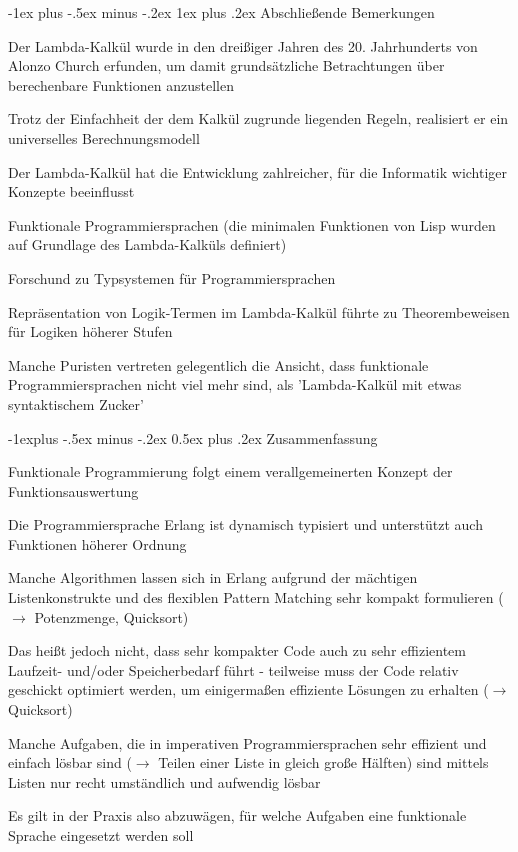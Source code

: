 \documentclass[10pt]{article}
\makeatletter
\renewcommand{\subsection}{\@startsection{subsection}{2}{0mm}%
                                {-1explus -.5ex minus -.2ex}%
                                {0.5ex plus .2ex}%
                                {\normalfont\normalsize\bfseries}}
\renewcommand{\subsubsection}{\@startsection{subsubsection}{3}{0mm}%
                                {-1ex plus -.5ex minus -.2ex}%
                                {1ex plus .2ex}%
                                {\normalfont\small\bfseries}}
\makeatother
\begin{document}
  \subsubsection{Abschließende Bemerkungen}
  \begin{itemize*}
    \item Der Lambda-Kalkül wurde in den dreißiger Jahren des 20. Jahrhunderts von Alonzo Church erfunden, um damit grundsätzliche Betrachtungen über berechenbare Funktionen anzustellen
    \item Trotz der Einfachheit der dem Kalkül zugrunde liegenden Regeln, realisiert er ein universelles Berechnungsmodell
    \item Der Lambda-Kalkül hat die Entwicklung zahlreicher, für die Informatik wichtiger Konzepte beeinflusst
    \begin{itemize*}
      \item Funktionale Programmiersprachen (die minimalen Funktionen von Lisp wurden auf Grundlage des Lambda-Kalküls definiert)
      \item Forschund zu Typsystemen für Programmiersprachen
      \item Repräsentation von Logik-Termen im Lambda-Kalkül führte zu Theorembeweisen für Logiken höherer Stufen
    \end{itemize*}
    \item Manche Puristen vertreten gelegentlich die Ansicht, dass funktionale Programmiersprachen nicht viel mehr sind, als 'Lambda-Kalkül mit etwas syntaktischem Zucker'
  \end{itemize*}
  
  \subsection{Zusammenfassung}
  \begin{itemize*}
    \item Funktionale Programmierung folgt einem verallgemeinerten Konzept der Funktionsauswertung
    \item Die Programmiersprache Erlang ist dynamisch typisiert und unterstützt auch Funktionen höherer Ordnung
    \item Manche Algorithmen lassen sich in Erlang aufgrund der mächtigen Listenkonstrukte und des flexiblen Pattern Matching sehr kompakt formulieren ($\rightarrow$ Potenzmenge, Quicksort)
    \item Das heißt jedoch nicht, dass sehr kompakter Code auch zu sehr effizientem Laufzeit- und/oder Speicherbedarf führt - teilweise muss der Code relativ geschickt optimiert werden, um einigermaßen effiziente Lösungen zu erhalten ($\rightarrow$ Quicksort)
    \item Manche Aufgaben, die in imperativen Programmiersprachen sehr effizient und einfach lösbar sind ($\rightarrow$ Teilen einer Liste in gleich große Hälften) sind mittels Listen nur recht umständlich und aufwendig lösbar
    \item Es gilt in der Praxis also abzuwägen, für welche Aufgaben eine funktionale Sprache eingesetzt werden soll
  \end{itemize*}
  
\end{document}
